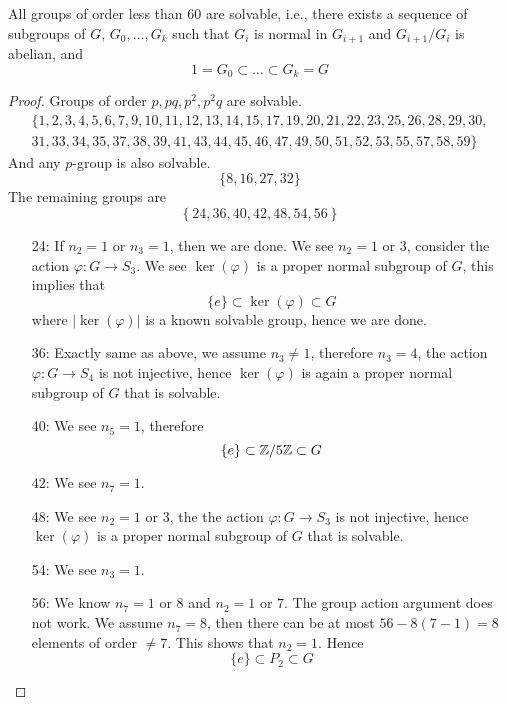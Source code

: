 \begin{prob}[S2014-Q2]
    All groups of order less than $60$ are solvable, i.e., there exists a sequence of subgroups of $G$, $G_0, \dots, G_k$ such that $G_i$ is normal in $G_{i+1}$ and $G_{i+1}/G_i$ is abelian, and 
    \begin{equation*}
        1=G_0\subset\dots\subset G_k=G
    \end{equation*}
\end{prob}
\begin{proof}
    Groups of order $p, pq, p^2, p^2q$ are solvable.
    \begin{align*}
        \big\{ 1, 2, 3, 4, 5, 6, 7, 9, 10, 11, 12, 13, 14, 15, 17, 19, 20, 21, 22, 23, 25, 26, 28, 29, 30, \\ 31, 33, 34, 35, 37, 38, 39, 41, 43, 44, 45, 46, 47, 49, 50, 51, 52, 53, 55, 57, 58, 59 \big\}
    \end{align*}
    And any $p$-group is also solvable. 
    \begin{equation*}
        \{8, 16, 27, 32\}
    \end{equation*}
    The remaining groups are 
    \begin{equation*}
        \left\{24, 36, 40, 42, 48, 54, 56 \right\}
    \end{equation*}
    \begin{itemize}
        \item[24:] If $n_2=1$ or $n_3=1$, then we are done. We see $n_2=1$ or $3$, consider the action $\varphi:G\to S_3$. We see $\ker(\varphi)$ is a proper normal subgroup of $G$, this implies that 
        \begin{equation*}
            \{e\}\subset \ker(\varphi)\subset G
        \end{equation*}
        where $|\ker(\varphi)|$ is a known solvable group, hence we are done.
        \item[36:] Exactly same as above, we assume $n_3\neq 1$, therefore $n_3=4$, the action $\varphi: G\to S_4$ is not injective, hence $\ker(\varphi)$ is again a proper normal subgroup of $G$ that is solvable.
        \item[40:] We see $n_5=1$, therefore 
        \begin{equation*}
            \{e\}\subset \mathbb{Z}/5\mathbb{Z}\subset G
        \end{equation*}
        \item[42:] We see $n_7=1$.
        \item[48:] We see $n_2=1$ or $3$, the the action $\varphi: G\to S_3$ is not injective, hence $\ker(\varphi)$ is a proper normal subgroup of $G$ that is solvable.
        \item[54:] We see $n_3=1$. 
        \item[56:] We know $n_7=1$ or $8$ and $n_2=1$ or $7$. The group action argument does not work. We assume $n_7=8$, then there can be at most $56-8(7-1)=8$ elements of order $\neq 7$. This shows that $n_2=1$. Hence 
        \begin{equation*}
            \{e\}\subset P_2\subset G
        \end{equation*}
    \end{itemize}
\end{proof}

